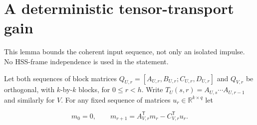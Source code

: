 \documentclass[11pt,oneside,openany,a4paper]{book}
\numberwithin{equation}{chapter}
\theoremstyle{definition}
\theoremstyle{remark}
\newcommand{\proofstep}[1]{\par\addvspace{.45\baselineskip}\Needspace{3\baselineskip}\textbf{#1}\par\nobreak}
\newcommand{\R}{\mathbb R}\newcommand{\E}{\mathbb E}\newcommand{\Prb}{\mathbb P}\newcommand{\PP}{\mathbb P}
\newcommand{\T}{\mathsf T}\newcommand{\Id}{I}
\newcommand{\F}[1]{\left\lVert#1\right\rVert_F}
\newcommand{\N}[1]{\left\lVert#1\right\rVert}
\newcommand{\op}[1]{\left\lVert#1\right\rVert_{\rm op}}
\newcommand{\ip}[2]{\left\langle#1,#2\right\rangle_F}
\DeclareMathOperator{\tr}{tr}\DeclareMathOperator{\rank}{rank}
\DeclareMathOperator{\diag}{blockdiag}\DeclareMathOperator{\range}{range}
\DeclareMathOperator{\HSS}{HSS}\DeclareMathOperator{\dist}{dist}
\DeclareMathOperator{\Var}{Var}\DeclareMathOperator{\supp}{supp}
\newcommand{\UC}{\mathcal U}\newcommand{\VC}{\mathcal V}\newcommand{\err}{\mathcal E}
\newcommand{\Sn}[2]{\left\lVert#1\right\rVert_{S_{#2}}}
\newcommand{\Cov}{\mathsf C}\newcommand{\Loss}{\mathsf L}\newcommand{\Fil}{\mathcal F}
\DeclareMathOperator{\diver}{div}\DeclareMathOperator{\vecop}{vec}\DeclareMathOperator{\Gammafun}{Gamma}
\begin{document}
\endgroup

\begingroup
\let\R\relax
\newcommand{\R}{\mathbb R}
\let\E\relax
\newcommand{\E}{\mathbb E}
\let\Prb\relax
\newcommand{\Prb}{\mathbb P}
\let\T\relax
\newcommand{\T}{\mathsf T}
\let\F\relax
\newcommand{\F}[1]{\left\lVert#1\right\rVert_{F}}
\let\N\relax
\newcommand{\N}[1]{\left\lVert#1\right\rVert}
\let\ip\relax
\newcommand{\ip}[2]{\left\langle#1,#2\right\rangle_F}
\let\tr\relax
\newcommand{\tr}{\operatorname{tr}}
\let\rank\relax
\newcommand{\rank}{\operatorname{rank}}
\let\diag\relax
\newcommand{\diag}{\operatorname{blockdiag}}
\let\range\relax
\newcommand{\range}{\operatorname{range}}
\let\OPT\relax
\newcommand{\OPT}{\operatorname{OPT}}
\let\HSS\relax
\newcommand{\HSS}{\operatorname{HSS}}
\let\diver\relax
\newcommand{\diver}{\operatorname{div}}
\let\Var\relax
\newcommand{\Var}{\operatorname{Var}}
\let\UC\relax
\newcommand{\UC}{\mathcal U}
\let\VC\relax
\newcommand{\VC}{\mathcal V}
\let\err\relax
\newcommand{\err}{\mathcal E}
\let\proofstep\relax
\newcommand{\proofstep}[1]{\par\addvspace{.45\baselineskip}\Needspace{3\baselineskip}\textbf{#1}\par\nobreak}
\let\op\relax
\newcommand{\op}[1]{\left\lVert#1\right\rVert_{\mathrm{op}}}
\let\Sn\relax
\newcommand{\Sn}[2]{\left\lVert#1\right\rVert_{S_{#2}}}
\let\Cov\relax
\newcommand{\Cov}{\mathsf C}
\let\Loss\relax
\newcommand{\Loss}{\mathsf L}
\let\Fil\relax
\newcommand{\Fil}{\mathcal F}
\let\Id\relax
\newcommand{\Id}{I}
\let\supp\relax
\newcommand{\supp}{\operatorname{supp}}
\let\vecop\relax
\newcommand{\vecop}{\operatorname{vec}}
\let\Gammafun\relax
\newcommand{\Gammafun}{\operatorname{Gamma}}
\chapter{A deterministic tensor-transport gain}\label{ch:frame_transport}
This lemma bounds the coherent input sequence, not only an isolated impulse. No HSS-frame independence is used in the statement.

Let both sequences of block matrices \(Q_{U,r}=[A_{U,r},B_{U,r};C_{U,r},D_{U,r}]\) and \(Q_{V,r}\) be orthogonal, with \(k\)-by-\(k\) blocks, for \(0\le r<h\). Write \(T_U(s,r)=A_{U,s}\cdots A_{U,r-1}\) and similarly for \(V\). For any fixed sequence of matrices \(u_r\in\mathbb R^{k\times q}\) let

\[
m_0=0,\qquad m_{r+1}=A_{V,r}^{\mathsf T}m_r-C_{V,r}^{\mathsf T}u_r.
\tag{\thechapter.1}\label{frame_transport:manual:1}
\]
\end{document}
